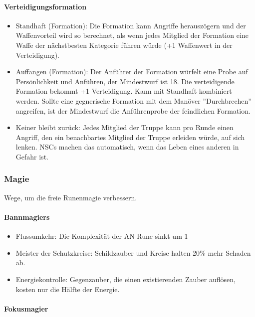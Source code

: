 \documentclass{article}
\begin{document}
\paragraph{Verteidigungsformation}

\begin{itemize}
\item Standhaft (Formation): Die Formation kann Angriffe herauszögern und der Waffenvorteil wird so berechnet, als wenn jedes Mitglied der Formation eine Waffe der nächstbesten Kategorie führen würde (+1 Waffenwert in der Verteidigung).
\item Auffangen (Formation): Der Anführer der Formation würfelt eine Probe auf Persönlichkeit und Anführen, der Mindestwurf ist 18. Die verteidigende Formation bekommt +1 Verteidigung. Kann mit Standhaft kombiniert werden. Sollte eine gegnerische Formation mit dem Manöver ''Durchbrechen'' angreifen, ist der Mindestwurf die Anführenprobe der feindlichen Formation.
\item Keiner bleibt zurück: Jedes Mitglied der Truppe kann pro Runde einen Angriff, den ein benachbartes Mitglied der Truppe erleiden würde, auf sich lenken. NSCs machen das automatisch, wenn das Leben eines anderen in Gefahr ist.
\end{itemize}

\subsubsection{Magie}

Wege, um die freie Runenmagie verbessern.

\paragraph{Bannmagiers}

\begin{itemize}
\item Flussumkehr: Die Komplexität der AN-Rune sinkt um 1
\item Meister der Schutzkreise: Schildzauber und Kreise halten 20\% mehr Schaden ab.
\item Energiekontrolle: Gegenzauber, die einen existierenden Zauber auflösen, kosten nur die Hälfte der Energie.
\end{itemize}

\paragraph{Fokusmagier}
\end{document}
